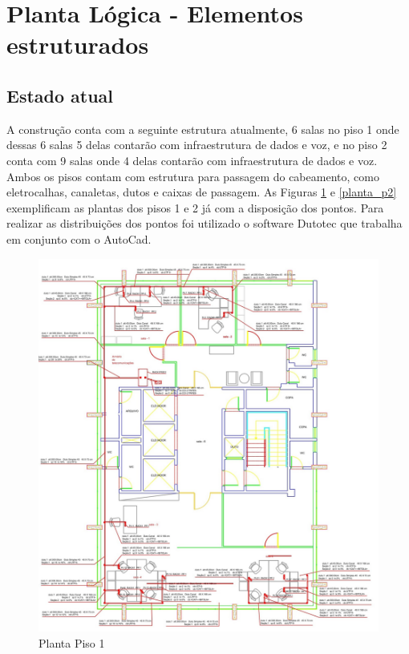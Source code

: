 \documentclass[	DIV=calc,%
							paper=a4,%
							fontsize=12pt,%
							onecolumn]{scrartcl}	 					%
\begin{document}
\section{Planta Lógica - Elementos estruturados}

\subsection{Estado atual}
A construção conta com a seguinte estrutura atualmente, 6 salas no piso 1 onde dessas 6 salas 5 delas contarão com infraestrutura de dados e voz, e no piso 2 conta com 9 salas onde 4 delas contarão com infraestrutura de dados e voz.\newline
Ambos os pisos contam com estrutura para passagem do cabeamento, como eletrocalhas, canaletas, dutos e caixas de passagem. As Figuras \ref{planta_p1} e \ref{planta_p2} exemplificam as plantas dos pisos 1 e 2 já com a disposição dos pontos.
Para realizar as distribuições dos pontos foi utilizado o software Dutotec que trabalha em conjunto com o AutoCad.

\begin{figure}
	\centering
	\includegraphics[width=\textwidth]{planta_p1}
	\caption{Planta Piso 1}
	\label{planta_p1}
\end{figure}
\FloatBarrier
\end{document}
